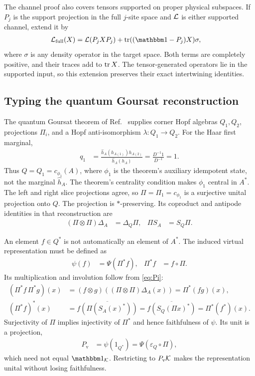 \documentclass[aps,pra,reprint,nofootinbib,onecolumn]{revtex4-2}
\begin{document}
The channel proof also covers tensors supported on proper physical
subspaces. If $P_j$ is the support projection in the full $j$-site
space and $\mathcal{L}$ is either supported channel, extend it by
\begin{align}
	\mc L_{\mathrm{full}}(X)
	 & =\mc L(P_jXP_j)+\tr((\Id-P_j)X)\sigma,
	\label{eq:extension}
\end{align}
where $\sigma$ is any density operator in the target space.
Both terms are completely positive, and their traces add to
$\operatorname{tr} X$. The tensor-generated operators lie in the supported input,
so this extension preserves their exact intertwining identities.

\subsection{Typing the quantum Goursat reconstruction}

The quantum Goursat theorem of Ref.~\cite{Goursat} supplies corner
Hopf algebras $Q_1,Q_2$, projections $\Pi_i$, and a Hopf
anti-isomorphism $\lambda:Q_1\to Q_2$.
For the Haar first marginal,
\begin{align}
	q_1
	 & =\frac{\hat h_A(h_{A(1)})h_{A(2)}}{\hat h_A(h_A)}
	=\frac{D^{-1}1}{D^{-1}}=1.
\end{align}
Thus $Q=Q_1=c_{\phi_1}(A)$, where $\phi_1$ is the theorem's auxiliary
idempotent state, not the marginal $\hat h_A$.
The theorem's centrality condition makes $\phi_1$ central in $A^*$.
The left and right slice projections agree, so
$\Pi=\Pi_1=c_{\phi_1}$ is a surjective unital projection onto $Q$.
The projection is $*$-preserving. Its coproduct and antipode identities
in that reconstruction are
\begin{align}
	(\Pi\otimes\Pi)\Delta_A & =\Delta_Q\Pi,
	                        &
	\Pi S_A                 & =S_Q\Pi.
	\label{eq:Pi}
\end{align}

An element $f\in Q^*$ is not automatically an element of $A^*$.
The induced virtual representation must be defined as
\begin{align}
	\psi(f) & =\Psi(\Pi^*f),
	        &
	\Pi^*f  & =f\circ\Pi.
	\label{eq:dualrep}
\end{align}
Its multiplication and involution follow from \cref{eq:Pi}:
\begin{align}
	(\Pi^*f\,\Pi^*g)(x)
	 & =(f\otimes g)((\Pi\otimes\Pi)\Delta_A(x))
	=\Pi^*(fg)(x),
	\\
	(\Pi^*f)^*(x)
	 & =\overline{f(\Pi(S_A(x)^*))}
	=\overline{f(S_Q(\Pi x)^*)}
	=\Pi^*(f^*)(x).
\end{align}
Surjectivity of $\Pi$ implies injectivity of $\Pi^*$ and hence
faithfulness of $\psi$. Its unit is a projection,
\begin{align}
	P_{\mathrm v}
	 & =\psi(1_{Q^*})=\Psi(\varepsilon_Q\circ\Pi),
\end{align}
which need not equal $\Id_{\mc K}$. Restricting to $P_{\mathrm v}\mathcal{K}$
makes the representation unital without losing faithfulness.
\end{document}
